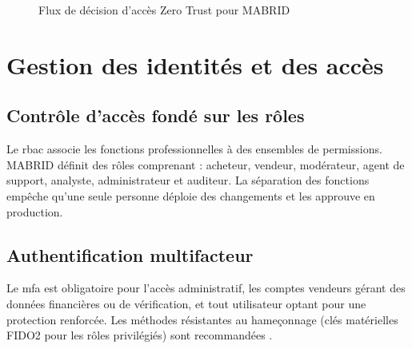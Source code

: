 \begin{figure}[H]
  \centering
  \caption{Flux de décision d'accès Zero Trust pour MABRID}
  \label{fig:zt-flow}
\end{figure}

\section{Gestion des identités et des accès}

\subsection{Contrôle d'accès fondé sur les rôles}

Le \gls{rbac} associe les fonctions professionnelles à des ensembles de permissions. MABRID définit des rôles comprenant : acheteur, vendeur, modérateur, agent de support, analyste, administrateur et auditeur. La séparation des fonctions empêche qu'une seule personne déploie des changements et les approuve en production.

\subsection{Authentification multifacteur}

Le \gls{mfa} est obligatoire pour l'accès administratif, les comptes vendeurs gérant des données financières ou de vérification, et tout utilisateur optant pour une protection renforcée. Les méthodes résistantes au hameçonnage (clés matérielles FIDO2 pour les rôles privilégiés) sont recommandées \parencite{nist80063b}.

